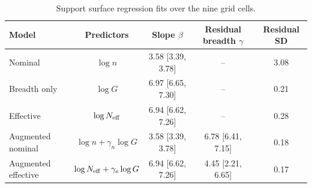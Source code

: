 \begin{table}[htbp]
\centering
\small
\begin{tabular}{lcccc}
\toprule
Model & Predictors & Slope $\beta$ & Residual breadth $\gamma$ & Residual SD \\
\midrule
Nominal & $\log n$ & 3.58 [3.39, 3.78] & -- & 3.08 \\
Breadth only & $\log G$ & 6.97 [6.65, 7.30] & -- & 0.21 \\
Effective & $\log N_{\mathrm{eff}}$ & 6.94 [6.62, 7.26] & -- & 0.28 \\
\midrule
Augmented nominal & $\log n + \gamma_n \log G$ & 3.58 [3.39, 3.78] & 6.78 [6.41, 7.15] & 0.18 \\
Augmented effective & $\log N_{\mathrm{eff}} + \gamma_e \log G$ & 6.94 [6.62, 7.26] & 4.45 [2.21, 6.65] & 0.17 \\
\bottomrule
\end{tabular}
\caption{Support surface regression fits over the nine grid cells.}
\label{tab:breadth_surface_fits}
\end{table}
